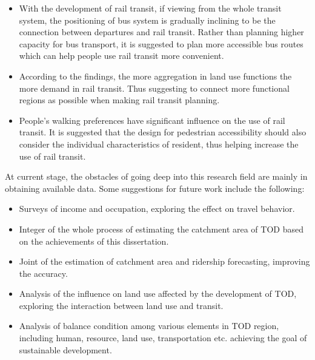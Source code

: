 %
\begin{itemize}
	\item With the development of rail transit, if viewing from the whole transit system, the positioning of bus system is gradually inclining to be the connection between departures and rail transit. Rather than planning higher capacity for bus transport, it is suggested to plan more accessible bus routes which can help people use rail transit more convenient.
	
	\item According to the findings, the more aggregation in land use functions the more demand in rail transit. Thus suggesting to connect more functional regions as possible when making rail transit planning.
	
	\item People's walking preferences have significant influence on the use of rail transit. It is suggested that the design for pedestrian accessibility should also consider the individual characteristics of resident, thus helping increase the use of rail transit.

\end{itemize}

At current stage, the obstacles of going deep into this research field are mainly in obtaining available data. Some suggestions for future work include the following:

\begin{itemize}
	\item Surveys of income and occupation, exploring the effect on travel behavior.
	
	\item Integer of the whole process of estimating the catchment area of TOD based on the achievements of this dissertation.
	
	\item Joint of the estimation of catchment area and ridership forecasting, improving the accuracy.
	
	\item Analysis of the influence on land use affected by the development of TOD, exploring the interaction between land use and transit.
	
	\item Analysis of balance condition among various elements in TOD region, including human, resource, land use, transportation etc. achieving the goal of sustainable development.
\end{itemize}

\clearpage %

% 
